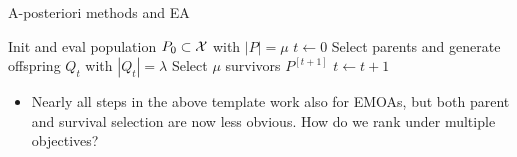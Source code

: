 \documentclass[11pt,compress,t,notes=noshow, xcolor=table]{beamer}
\begin{document}
\begin{vbframe}{A-posteriori methods and EA}
\framebreak



\begin{algorithm}[H]
  \begin{center}
  \caption{Basic EA template loop}
    \begin{algorithmic}[1]
    \State Init and eval population $P_0 \subset \mathcal{X}$ with $|P| = \mu$
    \State $t \leftarrow 0$
      \Repeat
        \State Select parents and generate offspring $Q_t$ with $|Q_t| = \lambda$
        \State Select $\mu$ survivors $P^{[t + 1]}$
 		\State $t \leftarrow t + 1$
            \vspace*{-0.3cm}
    \end{algorithmic}
    \end{center}
\end{algorithm}

\begin{itemize}
    \item Nearly all steps in the above template work also for EMOAs, but both parent and survival selection are now less obvious. How do we rank under multiple objectives?
\end{itemize}


\end{vbframe}


\end{document}
